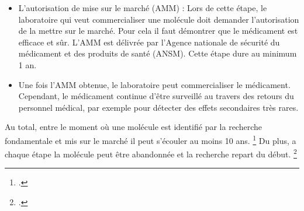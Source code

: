 \documentclass[12pt,a4paper]{report}
\begin{document}
\begin{appendix}
\begin{itemize}
    \item L’autorisation de mise sur le marché (AMM) : Lors de cette étape, le laboratoire qui veut commercialiser une molécule doit demander l'autorisation de la mettre sur le marché. Pour cela il faut démontrer que le médicament est efficace et sûr. L'AMM est délivrée par l'Agence nationale de sécurité du médicament et des produits de santé (ANSM). Cette étape dure au minimum 1 an.
    \item Une fois l'AMM obtenue, le laboratoire peut commercialiser le médicament. Cependant, le médicament continue d'être surveillé au travers des retours du personnel médical, par exemple pour détecter des effets secondaires très rares.
\end{itemize}

Au total, entre le moment où une molécule est identifié par la recherche fondamentale et mis sur le marché il peut s'écouler au moins 10 ans. \footcite{DeveloppementMedicamentInserm} Du plus, a chaque étape la molécule peut être abandonnée et la recherche repart du début. \footcite{denisvanwaerebekeJamesOuRoman2018}

\end{appendix}

\printbibliography
\end{document}
